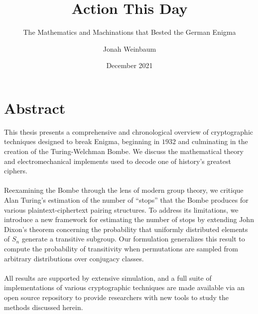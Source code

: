 \documentclass{dcthesis}
\title{Action This Day}
\subtitle{The Mathematics and Machinations that Bested the German Enigma}
\author{Jonah Weinbaum}
\date{December 2021}
\theoremstyle{definition}
\theoremstyle{remark}
\begin{document}
\frontmatter

\maketitle
\restoregeometry


\tableofcontents




\chapter*{Abstract}
This thesis presents a comprehensive and chronological overview of
cryptographic techniques designed to break Enigma, beginning in
$1932$ and culminating in the creation of the Turing-Welchman Bombe. We discuss the mathematical theory and electromechanical implements
used to decode one of history's greatest ciphers.
\\\\Reexamining the Bombe through the lens of modern group theory, we
critique Alan Turing's estimation of the number of ``stops'' that the
Bombe produces for various plaintext-ciphertext pairing structures.
To address its limitations, we introduce a new framework for
estimating the number of stops by extending John Dixon's theorem
concerning the probability that uniformly distributed elements of
$S_n$ generate a transitive subgroup. Our formulation generalizes
this result to compute the probability of transitivity when
permutations are sampled from arbitrary distributions over conjugacy classes.
\\\\All results are supported by extensive simulation, and a full
suite of implementations of various cryptographic techniques are made
available via an open source repository to provide researchers with
new tools to study the methods discussed herein.
\end{document}
